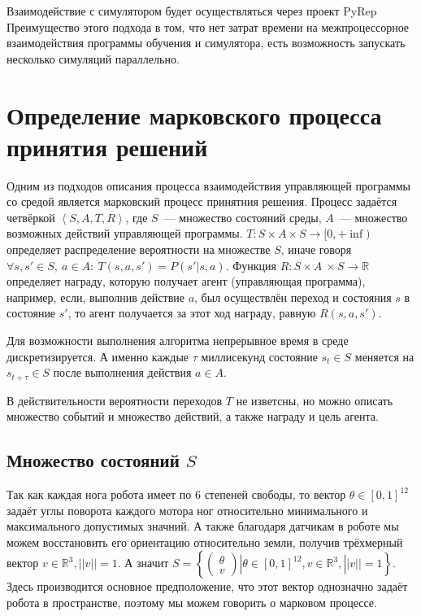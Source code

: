 Взаимодействие с симулятором будет осуществляться через проект PyRep \cite{james2019pyrep} Преимущество этого подхода в том, что нет затрат времени на межпроцессорное взаимодействия программы обучения и симулятора, есть возможность запускать несколько симуляций параллельно.

\section{Определение марковского процесса принятия решений}\label{sec:ch1/sec3}
Одним из подходов описания процесса взаимодействия управляющей программы со средой является марковский процесс принятния решения. Процесс задаётся четвёркой $\left<S, A, T, R\right>$, где $S$~--- множество состояний среды, $A$~--- множество возможных действий управляющей программы. $T: S\times A \times S \rightarrow [0, +\inf)$ определяет распределение вероятности на множестве $S$, иначе говоря $\forall s, s' \in S,\ a\in A:\ T(s, a, s') = P(s' | s, a)$. Функция $R : S \times A \ \times S \rightarrow \mathbb{R}$ определяет награду, которую получает агент (управляющая программа), например, если, выполнив действие $a$, был осуществлён переход и состояния $s$ в состояние $s'$, то агент получается за этот ход награду, равную $R(s, a, s')$. 

Для возможности выполнения алгоритма непрерывное время в среде дискретизируется. А именно каждые $\tau$ миллисекунд состояние $s_t \in S$ меняется на $s_{t+\tau} \in S$ после выполнения действия $a \in A$.

В действительности вероятности переходов $T$ не изветсны, но можно описать множество событий и множество действий, а также награду и цель агента.

\subsection{Множество состояний $S$}
Так как каждая нога робота имеет по 6 степеней свободы, то вектор $\theta \in {[0, 1]}^{12}$ задаёт углы поворота каждого мотора ног относительно минимального и максимального допустимых значний. А также благодаря датчикам в роботе мы можем восстановить его ориентацию относительно земли, получив трёхмерный вектор $v\in \mathbb{R}^3, ||v|| = 1 $. А значит $S = \left\{    \begin{pmatrix}
        \theta\\
        v
    \end{pmatrix}| \theta \in {[0, 1]}^{12}, v\in \mathbb{R}^3, ||v|| = 1\right\}$. Здесь производится основное предположение, что этот вектор однозначно задаёт робота в пространстве, поэтому мы можем говорить о марковом процессе.

